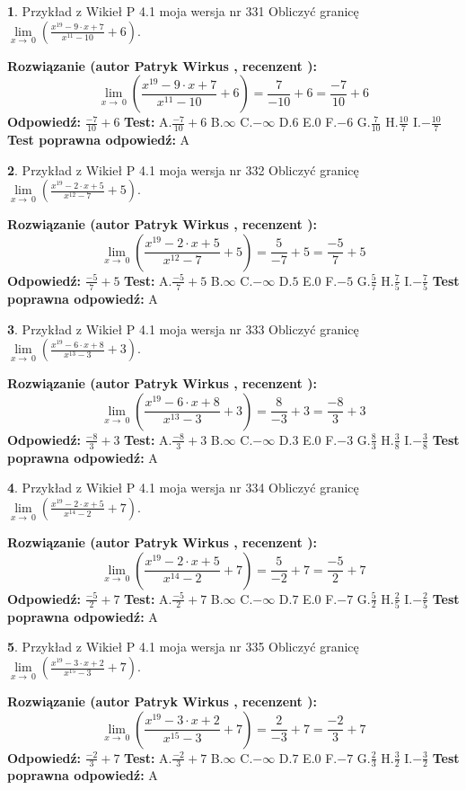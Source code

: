 \documentclass[12pt, a4paper]{article}
\theoremstyle{definition} %
\newtheorem{zad}{}
\newcommand{\zadStart}[1]{\begin{zad}#1\newline}
\newcommand{\zadStop}{\end{zad}}
\newcommand{\rozwStart}[2]{\noindent \textbf{Rozwiązanie (autor #1 , recenzent #2): }\newline}
\newcommand{\rozwStop}{\newline}
\newcommand{\odpStart}{\noindent \textbf{Odpowiedź:}\newline}
\newcommand{\odpStop}{\newline}
\newcommand{\testStart}{\noindent \textbf{Test:}\newline}
\newcommand{\testStop}{\newline}
\newcommand{\kluczStart}{\noindent \textbf{Test poprawna odpowiedź:}\newline}
\newcommand{\kluczStop}{\newline}
\begin{document}
\zadStart{Przykład z Wikieł P 4.1 moja wersja nr 331}
Obliczyć granicę $\lim\limits_{x\to\ 0}(\frac{x^{19}-9 \cdot x +7}{x^{11}-10}+6)$.
\zadStop
\rozwStart{Patryk Wirkus}{}
$$\lim\limits_{x\to\ 0}(\frac{x^{19}-9 \cdot x +7}{x^{11}-10}+6)=\frac{7}{-10}+6=\frac{-7}{10}+6$$
\rozwStop
\odpStart
$\frac{-7}{10}+6$
\odpStop
\testStart
A.$\frac{-7}{10}+6$
B.$\infty$
C.$-\infty$
D.$6$
E.$0$
F.$-6$
G.$\frac{7}{10}$
H.$\frac{10}{7}$
I.$-\frac{10}{7}$
\testStop
\kluczStart
A
\kluczStop



\zadStart{Przykład z Wikieł P 4.1 moja wersja nr 332}
Obliczyć granicę $\lim\limits_{x\to\ 0}(\frac{x^{19}-2 \cdot x +5}{x^{12}-7}+5)$.
\zadStop
\rozwStart{Patryk Wirkus}{}
$$\lim\limits_{x\to\ 0}(\frac{x^{19}-2 \cdot x +5}{x^{12}-7}+5)=\frac{5}{-7}+5=\frac{-5}{7}+5$$
\rozwStop
\odpStart
$\frac{-5}{7}+5$
\odpStop
\testStart
A.$\frac{-5}{7}+5$
B.$\infty$
C.$-\infty$
D.$5$
E.$0$
F.$-5$
G.$\frac{5}{7}$
H.$\frac{7}{5}$
I.$-\frac{7}{5}$
\testStop
\kluczStart
A
\kluczStop



\zadStart{Przykład z Wikieł P 4.1 moja wersja nr 333}
Obliczyć granicę $\lim\limits_{x\to\ 0}(\frac{x^{19}-6 \cdot x +8}{x^{13}-3}+3)$.
\zadStop
\rozwStart{Patryk Wirkus}{}
$$\lim\limits_{x\to\ 0}(\frac{x^{19}-6 \cdot x +8}{x^{13}-3}+3)=\frac{8}{-3}+3=\frac{-8}{3}+3$$
\rozwStop
\odpStart
$\frac{-8}{3}+3$
\odpStop
\testStart
A.$\frac{-8}{3}+3$
B.$\infty$
C.$-\infty$
D.$3$
E.$0$
F.$-3$
G.$\frac{8}{3}$
H.$\frac{3}{8}$
I.$-\frac{3}{8}$
\testStop
\kluczStart
A
\kluczStop



\zadStart{Przykład z Wikieł P 4.1 moja wersja nr 334}
Obliczyć granicę $\lim\limits_{x\to\ 0}(\frac{x^{19}-2 \cdot x +5}{x^{14}-2}+7)$.
\zadStop
\rozwStart{Patryk Wirkus}{}
$$\lim\limits_{x\to\ 0}(\frac{x^{19}-2 \cdot x +5}{x^{14}-2}+7)=\frac{5}{-2}+7=\frac{-5}{2}+7$$
\rozwStop
\odpStart
$\frac{-5}{2}+7$
\odpStop
\testStart
A.$\frac{-5}{2}+7$
B.$\infty$
C.$-\infty$
D.$7$
E.$0$
F.$-7$
G.$\frac{5}{2}$
H.$\frac{2}{5}$
I.$-\frac{2}{5}$
\testStop
\kluczStart
A
\kluczStop



\zadStart{Przykład z Wikieł P 4.1 moja wersja nr 335}
Obliczyć granicę $\lim\limits_{x\to\ 0}(\frac{x^{19}-3 \cdot x +2}{x^{15}-3}+7)$.
\zadStop
\rozwStart{Patryk Wirkus}{}
$$\lim\limits_{x\to\ 0}(\frac{x^{19}-3 \cdot x +2}{x^{15}-3}+7)=\frac{2}{-3}+7=\frac{-2}{3}+7$$
\rozwStop
\odpStart
$\frac{-2}{3}+7$
\odpStop
\testStart
A.$\frac{-2}{3}+7$
B.$\infty$
C.$-\infty$
D.$7$
E.$0$
F.$-7$
G.$\frac{2}{3}$
H.$\frac{3}{2}$
I.$-\frac{3}{2}$
\testStop
\kluczStart
A
\kluczStop
\end{document}
